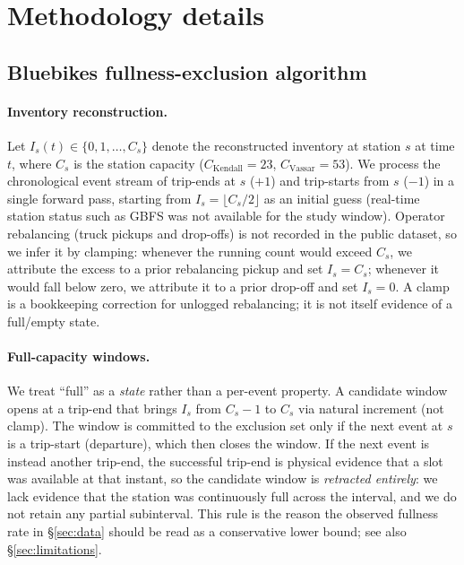 
\section{Methodology details}\label{app:methods}

\subsection{Bluebikes fullness-exclusion algorithm}\label{app:fullness}

\paragraph{Inventory reconstruction.} Let $I_s(t) \in \{0, 1, \dots, C_s\}$ denote the reconstructed inventory at station $s$ at time $t$, where $C_s$ is the station capacity ($C_{\text{Kendall}} = 23$, $C_{\text{Vassar}} = 53$). We process the chronological event stream of trip-ends at $s$ ($+1$) and trip-starts from $s$ ($-1$) in a single forward pass, starting from $I_s = \lfloor C_s/2 \rfloor$ as an initial guess (real-time station status such as GBFS was not available for the study window). Operator rebalancing (truck pickups and drop-offs) is not recorded in the public dataset, so we infer it by clamping: whenever the running count would exceed $C_s$, we attribute the excess to a prior rebalancing pickup and set $I_s = C_s$; whenever it would fall below zero, we attribute it to a prior drop-off and set $I_s = 0$. A clamp is a bookkeeping correction for unlogged rebalancing; it is not itself evidence of a full/empty state.

\paragraph{Full-capacity windows.} We treat ``full'' as a \emph{state} rather than a per-event property. A candidate window opens at a trip-end that brings $I_s$ from $C_s - 1$ to $C_s$ via natural increment (not clamp). The window is committed to the exclusion set only if the next event at $s$ is a trip-start (departure), which then closes the window. If the next event is instead another trip-end, the successful trip-end is physical evidence that a slot was available at that instant, so the candidate window is \emph{retracted entirely}: we lack evidence that the station was continuously full across the interval, and we do not retain any partial subinterval. This rule is the reason the observed fullness rate in \S\ref{sec:data} should be read as a conservative lower bound; see also \S\ref{sec:limitations}.

